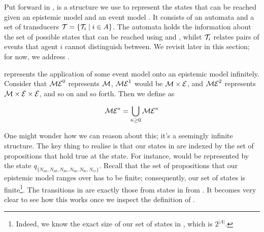 \documentclass[12pt, a4paper]{article}
\begin{document}
Put forward in \cite{AutomataTechniques}, \mestar is a structure we use to
represent the states that can be reached given an epistemic model  and an
event model . It consists of an automata  and a set of
transducers $\mathcal{T} = \left\{ \mathcal{T}_i \mid i \in A \right\}$. The automata
 holds the information about the set of possible states that can be
reached using  and , whilst $\mathcal{T}_i$ relates pairs of events
that agent $i$ cannot distinguish between. We revisit  later in this
section; for now, we address .

\bigskip

 represents the application of some event model  onto an epistemic
model  infinitely. Consider that $\mathcal{ME}^0$ represents $\mathcal{M}$,
$\mathcal{ME}^1$ would be $\mathcal{M} \times \mathcal{E}$, and $\mathcal{ME}^2$ represents $\mathcal{M}
\times \mathcal{E} \times \mathcal{E}$, and so on and so forth. Then we define \mestar as

\begin{equation*}
  \mathcal{ME}^\ast = \bigcup_{n \geq 0} \mathcal{ME}^n
\end{equation*}

One might wonder how we can reason about this; it's a seemingly infinite
structure. The key thing to realise is that our states in \mestar are indexed by
the set of propositions that hold true at the state. For instance,
 would be represented by the state $q_{\{N_{aa},
  N_{ab}, N_{ba}, N_{ba}, N_{bc}, N_{cc}\}}$. Recall that the set of propositions that
our epistemic model ranges over has to be finite; consequently, our set of
states is finite\footnote{Indeed, we know the exact size of our set of states in
\mestar, which is $2^{|\Lambda|}$.}. The transitions in \mestar are exactly
those from states in  from . It becomes very clear to see how this
works once we inspect the definition of \mestar. 


\end{document}
